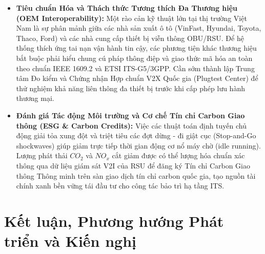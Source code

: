 \documentclass[a4paper]{article}
\begin{document}
\begin{itemize}
    Để thúc đẩy tốc độ xã hội hóa hạ tầng V2X, Chính phủ cần sớm ban hành cơ chế "Sandbox" cho phép thí điểm thu phí dịch vụ giá trị gia tăng V2X (như dịch vụ cảnh báo an toàn cao cấp, hỗ trợ tự lái cho xe logistics) theo hình thức đối tác công - tư (PPP). Doanh nghiệp viễn thông đầu tư hạ tầng mạng và thu hồi vốn thông qua gói cước dịch vụ viễn thông ITS, giảm bớt gánh nặng cho ngân sách nhà nước.
    \item \textbf{Tiêu chuẩn Hóa và Thách thức Tương thích Đa Thương hiệu (OEM Interoperability):}
    Một rào cản kỹ thuật lớn tại thị trường Việt Nam là sự phân mảnh giữa các nhà sản xuất ô tô (VinFast, Hyundai, Toyota, Thaco, Ford) và các nhà cung cấp thiết bị viễn thông OBU/RSU. Để hệ thống thích ứng tai nạn vận hành tin cậy, các phương tiện khác thương hiệu bắt buộc phải hiểu chung cú pháp thông điệp và giao thức mã hóa an toàn theo chuẩn IEEE 1609.2 và ETSI ITS-G5/3GPP. Cần sớm thành lập Trung tâm Đo kiểm và Chứng nhận Hợp chuẩn V2X Quốc gia (Plugtest Center) để thử nghiệm khả năng liên thông đa thiết bị trước khi cấp phép lưu hành thương mại.
    \item \textbf{Đánh giá Tác động Môi trường và Cơ chế Tín chỉ Carbon Giao thông (ESG \& Carbon Credits):}
    Việc các thuật toán định tuyến chủ động giải tỏa xung đột và triệt tiêu các đợt dừng - đi giật cục (Stop-and-Go shockwaves) giúp giảm trực tiếp thời gian động cơ nổ máy chờ (idle running). Lượng phát thải $CO_2$ và $NO_x$ cắt giảm được có thể lượng hóa chuẩn xác thông qua dữ liệu giám sát V2I của RSU để đăng ký Tín chỉ Carbon Giao thông Thông minh trên sàn giao dịch tín chỉ carbon quốc gia, tạo nguồn tài chính xanh bền vững tái đầu tư cho công tác bảo trì hạ tầng ITS.
\end{itemize}

\clearpage

\section{Kết luận, Phương hướng Phát triển và Kiến nghị}
\end{document}
